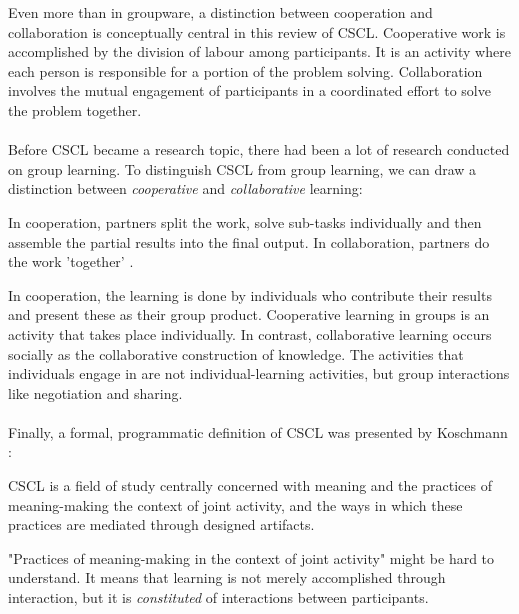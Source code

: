 Even more than in groupware, a distinction between cooperation and collaboration is conceptually central in this review of CSCL. Cooperative work is accomplished by the division of labour among participants. It is an activity where each person is responsible for a portion of the problem solving. Collaboration involves the mutual engagement of participants in a coordinated effort to solve the problem together.
\\ \\
Before CSCL became a research topic, there had been a lot of research conducted on group learning. To distinguish CSCL from group learning, we can draw a distinction between \textit{cooperative} and \textit{collaborative} learning:

\begin{mydef}
In cooperation, partners split the work, solve sub-tasks individually and then assemble the partial results into the final output. In collaboration, partners do the work 'together' \cite {DefinitionCSCL}.
\end{mydef}

In cooperation, the learning is done by individuals who contribute their results and present these as their group product. Cooperative learning in groups is an activity that takes place individually. In contrast, collaborative learning occurs socially as the collaborative construction of knowledge. The activities that individuals engage in are not individual-learning activities, but group interactions like negotiation and sharing.
\\ \\
Finally, a formal, programmatic definition of CSCL was presented by Koschmann \cite{DefinitionCSCL2}:
\begin{mydef}
CSCL is a field of study centrally concerned with meaning and the practices of meaning-making the context of joint activity, and the ways in which these practices are mediated through designed artifacts.
\end{mydef}
"Practices of meaning-making in the context of joint activity" might be hard to understand. It means that learning is not merely accomplished through interaction, but it is \textit{constituted} of interactions between participants. 



